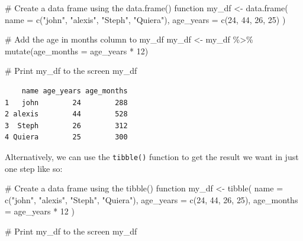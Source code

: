 \documentclass[
  letterpaper,
  DIV=11,
  numbers=noendperiod]{scrreprt}
\newenvironment{Shaded}{\begin{snugshade}}{\end{snugshade}}
\newcommand{\AttributeTok}[1]{\textcolor[rgb]{0.40,0.45,0.13}{#1}}
\newcommand{\CommentTok}[1]{\textcolor[rgb]{0.37,0.37,0.37}{#1}}
\newcommand{\DecValTok}[1]{\textcolor[rgb]{0.68,0.00,0.00}{#1}}
\newcommand{\FunctionTok}[1]{\textcolor[rgb]{0.28,0.35,0.67}{#1}}
\newcommand{\NormalTok}[1]{\textcolor[rgb]{0.00,0.23,0.31}{#1}}
\newcommand{\OtherTok}[1]{\textcolor[rgb]{0.00,0.23,0.31}{#1}}
\newcommand{\SpecialCharTok}[1]{\textcolor[rgb]{0.37,0.37,0.37}{#1}}
\newcommand{\StringTok}[1]{\textcolor[rgb]{0.13,0.47,0.30}{#1}}
\begin{document}
\begin{Shaded}
\begin{Highlighting}[]
\CommentTok{\# Create a data frame using the data.frame() function}
\NormalTok{my\_df }\OtherTok{\textless{}{-}} \FunctionTok{data.frame}\NormalTok{(}
  \AttributeTok{name       =} \FunctionTok{c}\NormalTok{(}\StringTok{"john"}\NormalTok{, }\StringTok{"alexis"}\NormalTok{, }\StringTok{"Steph"}\NormalTok{, }\StringTok{"Quiera"}\NormalTok{),}
  \AttributeTok{age\_years  =} \FunctionTok{c}\NormalTok{(}\DecValTok{24}\NormalTok{, }\DecValTok{44}\NormalTok{, }\DecValTok{26}\NormalTok{, }\DecValTok{25}\NormalTok{)}
\NormalTok{)}

\CommentTok{\# Add the age in months column to my\_df}
\NormalTok{my\_df }\OtherTok{\textless{}{-}}\NormalTok{ my\_df }\SpecialCharTok{\%\textgreater{}\%} \FunctionTok{mutate}\NormalTok{(}\AttributeTok{age\_months =}\NormalTok{ age\_years }\SpecialCharTok{*} \DecValTok{12}\NormalTok{)}

\CommentTok{\# Print my\_df to the screen}
\NormalTok{my\_df}
\end{Highlighting}
\end{Shaded}

\begin{verbatim}
    name age_years age_months
1   john        24        288
2 alexis        44        528
3  Steph        26        312
4 Quiera        25        300
\end{verbatim}

Alternatively, we can use the \texttt{tibble()} function to get the
result we want in just one step like so:

\begin{Shaded}
\begin{Highlighting}[]
\CommentTok{\# Create a data frame using the tibble() function}
\NormalTok{my\_df }\OtherTok{\textless{}{-}} \FunctionTok{tibble}\NormalTok{(}
  \AttributeTok{name       =} \FunctionTok{c}\NormalTok{(}\StringTok{"john"}\NormalTok{, }\StringTok{"alexis"}\NormalTok{, }\StringTok{"Steph"}\NormalTok{, }\StringTok{"Quiera"}\NormalTok{),}
  \AttributeTok{age\_years  =} \FunctionTok{c}\NormalTok{(}\DecValTok{24}\NormalTok{, }\DecValTok{44}\NormalTok{, }\DecValTok{26}\NormalTok{, }\DecValTok{25}\NormalTok{),}
  \AttributeTok{age\_months =}\NormalTok{ age\_years }\SpecialCharTok{*} \DecValTok{12}
\NormalTok{)}

\CommentTok{\# Print my\_df to the screen}
\NormalTok{my\_df}
\end{Highlighting}
\end{Shaded}
\end{document}

